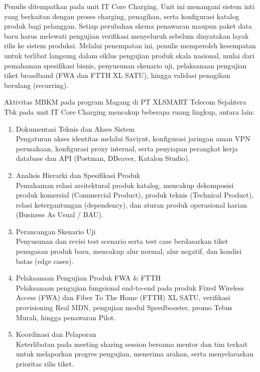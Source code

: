 \documentclass[12pt,a4paper]{article}
\begin{document}
Penulis ditempatkan pada unit IT Core Charging. Unit ini menangani sistem inti yang berkaitan dengan proses charging, penagihan, serta konfigurasi katalog produk bagi pelanggan. Setiap perubahan skema penawaran maupun paket data baru harus melewati pengujian verifikasi menyeluruh sebelum dinyatakan layak rilis ke sistem produksi. Melalui penempatan ini, penulis memperoleh kesempatan untuk terlibat langsung dalam siklus pengujian produk skala nasional, mulai dari pemahaman spesifikasi bisnis, penyusunan skenario uji, pelaksanaan pengujian tiket broadband (FWA dan FTTH XL SATU), hingga validasi penagihan berulang (recurring).

\vspace{0.3cm}
Aktivitas MBKM pada program Magang di PT XLSMART Telecom Sejahtera Tbk pada unit IT Core Charging mencakup beberapa ruang lingkup, antara lain:
\begin{enumerate}[label=\arabic*),leftmargin=1.5em,itemsep=1pt,topsep=2pt]
    \item Dokumentasi Teknis dan Akses Sistem\\
    Pengaturan akses identitas melalui Saviynt, konfigurasi jaringan aman VPN perusahaan, konfigurasi proxy internal, serta penyiapan perangkat kerja database dan API (Postman, DBeaver, Katalon Studio).
    \item Analisis Hierarki dan Spesifikasi Produk\\
    Pemahaman relasi arsitektural produk katalog, mencakup dekomposisi produk komersial (Commercial Product), produk teknis (Technical Product), relasi ketergantungan (dependency), dan aturan produk operasional harian (Business As Usual / BAU).
    \item Perancangan Skenario Uji\\
    Penyusunan dan revisi test scenario serta test case berdasarkan tiket penugasan produk baru, mencakup alur normal, alur negatif, dan kondisi batas (edge cases).
    \item Pelaksanaan Pengujian Produk FWA \& FTTH\\
    Pelaksanaan pengujian fungsional end-to-end pada produk Fixed Wireless Access (FWA) dan Fiber To The Home (FTTH) XL SATU, verifikasi provisioning Real MDN, pengujian modul Speedbooster, promo Tebus Murah, hingga penawaran Pilot.
    \item Koordinasi dan Pelaporan\\
    Keterlibatan pada meeting sharing session bersama mentor dan tim terkait untuk melaporkan progres pengujian, menerima arahan, serta menyelaraskan prioritas rilis tiket.
\end{enumerate}
\end{document}
